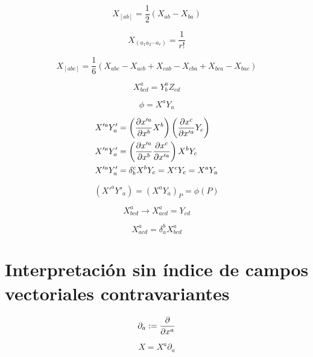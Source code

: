 \documentclass[../main]{subfiles}
\begin{document}
\begin{equation}
    X_{[ab]}=\dfrac{1}{2}(X_{ab}-X_{ba})
\end{equation}

\begin{equation*}
    X_{(a_1 a_2 \cdots a_r)}=\dfrac{1}{r!}
\end{equation*}

\begin{equation}
    X_{[abc]}=\dfrac{1}{6}(X_{abc}-X_{acb}+X_{cab}-X_{cba}+X_{bca}-X_{bac})
\end{equation}

\begin{equation}
    X^a_{bcd}=Y^a_b Z_{cd}
\end{equation}

\begin{equation}
    \phi=X^a Y_a
\end{equation}

\begin{align*}
    X'^a Y'_a&= \left( \pdv{x'^a}{x^b} X^b \right) \left( \pdv{x^c}{x'^a} Y_c \right) \\
    X'^a Y'_a&= \left( \pdv{x'^a}{x^b} \pdv{x^c}{x'^a} \right) X^b Y_c \\
    X'^a Y'_a&= \delta_b^c X^b Y_c=X^c Y_c=X^a Y_a 
\end{align*}

\begin{equation}
    (X'^a Y'_a)=(X^a Y_a)_P =\phi(P)
\end{equation}

\begin{equation*}
    X^a_{bcd} \rightarrow X^a_{acd}=Y_{cd}
\end{equation*}

\begin{equation}
    X_{acd}^a=\delta_a^b X^a_{bcd}
\end{equation}

\section{Interpretación sin índice de campos vectoriales contravariantes}

\begin{equation*}
    \partial_a :=\pdv{}{x^a}
\end{equation*}

\begin{equation}
    X=X^a \partial_a
\end{equation}
\end{document}
